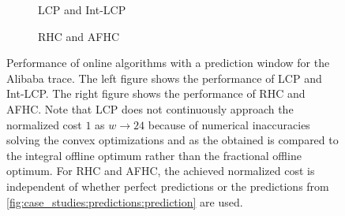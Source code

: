 \begin{figure}
    \begin{subfigure}[b]{.5175\linewidth}
    \resizebox{\textwidth}{!}{}
    \caption{LCP and Int-LCP}\label{fig:case_studies:predictions:lcp}
    \end{subfigure}
    \begin{subfigure}[b]{.4825\linewidth}
    \resizebox{\textwidth}{!}{}
    \caption{RHC and AFHC}\label{fig:case_studies:predictions:mpc}
    \end{subfigure}
    \caption{Performance of online algorithms with a prediction window for the Alibaba trace. The left figure shows the performance of LCP and Int-LCP. The right figure shows the performance of RHC and AFHC. Note that LCP does not continuously approach the normalized cost $1$ as $w \to 24$ because of numerical inaccuracies solving the convex optimizations and as the obtained is compared to the integral offline optimum rather than the fractional offline optimum. For RHC and AFHC, the achieved normalized cost is independent of whether perfect predictions or the predictions from \cref{fig:case_studies:predictions:prediction} are used.}
\end{figure}